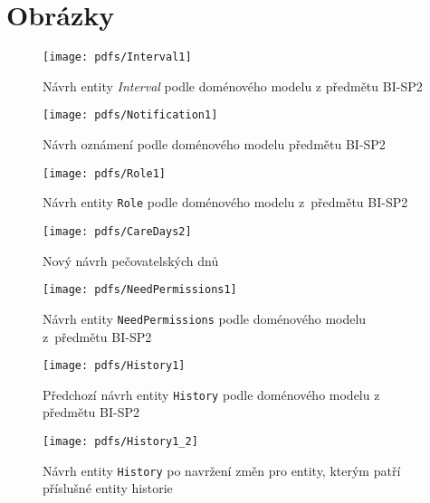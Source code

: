 \chapter{Obrázky}\label{dodatek:images}
    \begin{figure}\centering
        \texttt{[image: pdfs/Interval1]}
        \caption[Předešlý návrh entity \texttt{Interval}]{Návrh entity \textit{Interval} podle doménového modelu z předmětu BI-SP2}\label{image:Interval1}
    \end{figure}
    \begin{figure}\centering
            \texttt{[image: pdfs/Notification1]}
            \caption[Předešlý návrh oznámení]{Návrh oznámení podle doménového modelu předmětu BI-SP2}\label{image:notification1}
        \end{figure}
        \begin{figure}\centering
	        \texttt{[image: pdfs/Role1]}
	        \caption[Návrh \texttt{Role}]{Návrh entity \texttt{Role} podle doménového modelu z~předmětu BI-SP2}\label{image:Role1}
        \end{figure}
    \begin{figure}\centering
	       \texttt{[image: pdfs/CareDays2]}
	       \caption[Nový návrh pečovatelských dnů]{Nový návrh pečovatelských dnů}\label{image:caredays2}
        \end{figure}
          \begin{figure}\centering
	        \texttt{[image: pdfs/NeedPermissions1]}
	        \caption[Návrh entity \texttt{NeedPermissions}]{Návrh entity \texttt{NeedPermissions} podle doménového modelu z~předmětu BI-SP2}\label{image:NeedPermissions1}
        \end{figure}
    \begin{figure}\centering
        \texttt{[image: pdfs/History1]}
        \caption[Předešlý návrh entity \texttt{History}]{Předchozí návrh entity \texttt{History} podle doménového modelu z předmětu BI-SP2}\label{image:History1}
    \end{figure}
    \begin{figure}\centering
        \texttt{[image: pdfs/History1\_2]}
        \caption[Návrh entity \texttt{History} po změnách návrhu]{Návrh entity \texttt{History} po navržení změn pro entity, kterým patří příslušné entity historie}\label{image:History1_2}
    \end{figure}

